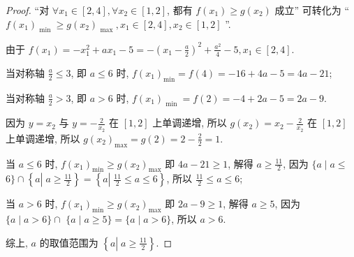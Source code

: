 \begin{proof}
  “对 \(\forall {x}_{1} \in  \left\lbrack  {2, 4}\right\rbrack  , \forall {x}_{2} \in  \left\lbrack  {1, 2}\right\rbrack\), 都有 \(f\left( {x}_{1}\right)  \geq  g\left( {x}_{2}\right)\) 成立” 可转化为 “ \(f{\left( {x}_{1}\right) }_{\text{ min }} \geq  g{\left( {x}_{2}\right) }_{\text{ max }}, {x}_{1} \in  \left\lbrack  {2, 4}\right\rbrack  , {x}_{2} \in  \left\lbrack  {1, 2}\right\rbrack\) ”.

由于 \(f\left( {x}_{1}\right)  =  -{x}_{1}^{2} + a{x}_{1} -5 =  -{\left( {x}_{1} -\frac{a}{2}\right) }^{2} + \frac{{a}^{2}}{4} -5, {x}_{1} \in  \left\lbrack  {2, 4}\right\rbrack\).

当对称轴 \(\frac{a}{2} \leq  3\), 即 \(a \leq  6\) 时, \(f{\left( {x}_{1}\right) }_{\min } = f\left( 4\right)  =  -{16} + {4a} -5 = {4a} -{21}\);

当对称轴 \(\frac{a}{2} > 3\), 即 \(a > 6\) 时, \(f{\left( {x}_{1}\right) }_{\text{ min }} = f\left( 2\right)  =  -4 + {2a} -5 = {2a} -9\).

因为 \(y = {x}_{2}\) 与 \(y =  -\frac{2}{{x}_{2}}\) 在 \(\left\lbrack  {1, 2}\right\rbrack\) 上单调递增, 所以 \(g\left( {x}_{2}\right)  = {x}_{2} -\frac{2}{{x}_{2}}\) 在 \(\left\lbrack  {1, 2}\right\rbrack\) 上单调递增, 所以 \(g{\left( {x}_{2}\right) }_{\max } = g\left( 2\right)  = 2 -\frac{2}{2} = 1\).

当 \(a \leq  6\) 时, \(f{\left( {x}_{1}\right) }_{\min } \geq  g{\left( {x}_{2}\right) }_{\max }\) 即 \({4a} -{21} \geq  1\), 解得 \(a \geq  \frac{11}{2}\), 因为 \(\{ a \mid  a \leq\)  \(6\}  \cap  \left\{  {a\left| {\;a \geq  \frac{11}{2}}\right. }\right\}   = \left\{  {a\left| {\;\frac{11}{2} \leq  a \leq  6}\right. }\right\}\), 所以 \(\frac{11}{2} \leq  a \leq  6\);

当 \(a > 6\) 时, \(f{\left( {x}_{1}\right) }_{\min } \geq  g{\left( {x}_{2}\right) }_{\max }\) 即 \({2a} -9 \geq  1\), 解得 \(a \geq  5\), 因为 \(\{ a \mid  a > 6\}  \cap\)  \(\{ a \mid  a \geq  5\}  = \{ a \mid  a > 6\}\), 所以 \(a > 6\).

综上, \(a\) 的取值范围为 \(\left\{  {a\left| {\;a \geq  \frac{11}{2}}\right. }\right\}\).
\end{proof}


